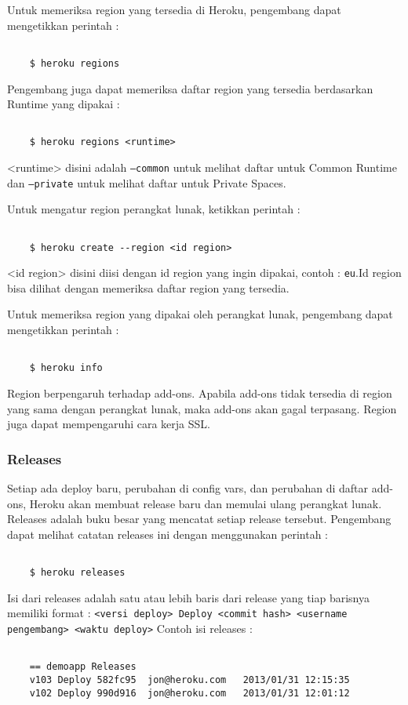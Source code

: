 Untuk memeriksa region yang tersedia di Heroku, pengembang dapat mengetikkan perintah :
\begin{lstlisting}

	$ heroku regions

\end{lstlisting}

Pengembang juga dapat memeriksa daftar region yang tersedia berdasarkan Runtime yang dipakai :
\begin{lstlisting}

	$ heroku regions <runtime>

\end{lstlisting}
<runtime> disini adalah \texttt{--common} untuk melihat daftar untuk Common Runtime dan \texttt{--private} untuk melihat daftar untuk Private Spaces.

Untuk mengatur region perangkat lunak, ketikkan perintah :
\begin{lstlisting}

	$ heroku create --region <id region>

\end{lstlisting}
<id region> disini diisi dengan id region yang ingin dipakai, contoh : \texttt{eu}.Id region bisa dilihat dengan memeriksa daftar region yang tersedia.

Untuk memeriksa region yang dipakai oleh perangkat lunak, pengembang dapat mengetikkan perintah :
\begin{lstlisting}

	$ heroku info

\end{lstlisting}

Region berpengaruh terhadap add-ons. Apabila add-ons tidak tersedia di region yang sama dengan perangkat lunak, maka add-ons akan gagal terpasang. Region juga dapat mempengaruhi cara kerja SSL.

\subsubsection{Releases}
Setiap ada deploy baru, perubahan di config vars, dan perubahan di daftar add-ons, Heroku akan membuat release baru dan memulai ulang perangkat lunak. Releases adalah buku besar yang mencatat setiap release tersebut. Pengembang dapat melihat catatan releases ini dengan menggunakan perintah :
\begin{lstlisting}

	$ heroku releases

\end{lstlisting}
Isi dari releases adalah satu atau lebih baris dari release yang tiap barisnya memiliki format : \texttt{<versi deploy> Deploy <commit hash> <username pengembang> <waktu deploy>} Contoh isi releases :
\begin{lstlisting}

	== demoapp Releases
	v103 Deploy 582fc95  jon@heroku.com   2013/01/31 12:15:35
	v102 Deploy 990d916  jon@heroku.com   2013/01/31 12:01:12
	
\end{lstlisting}

